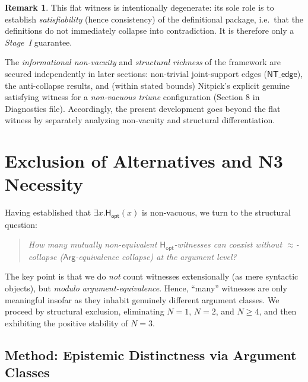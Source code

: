 \documentclass[a4paper, 11pt]{article}
\theoremstyle{plain}
\theoremstyle{definition}
\newtheorem{remark}{Remark}[section]
\newcommand{\Arg}{\mathsf{Arg}}           %
\newcommand{\Hopt}{\mathsf{H_{opt}}}       %
\begin{document}
\begin{remark}
This flat witness is intentionally degenerate: its sole role is to establish \emph{satisfiability} (hence consistency) of the definitional package, i.e.\ that the definitions do not immediately collapse into contradiction.
It is therefore only a \emph{Stage~I} guarantee.

The \emph{informational non-vacuity} and \emph{structural richness} of the framework are secured independently in later sections: non-trivial joint-support edges ($\mathsf{NT\_edge}$), the anti-collapse results, and (within stated bounds) Nitpick's explicit genuine satisfying witness for a \emph{non-vacuous triune} configuration (Section 8 in Diagnostics file).
Accordingly, the present development goes beyond the flat witness by separately analyzing non-vacuity and structural differentiation.
\end{remark}

\newpage


\section{Exclusion of Alternatives and N3 Necessity}
\label{sec:exclusion}

Having established that $\exists x.\Hopt(x)$ is non-vacuous, we turn to the structural question:

\begin{quote}
\emph{How many mutually non-equivalent $\Hopt$-witnesses can coexist without $\approx$-collapse ($\Arg$-equivalence collapse) at the argument level?}
\end{quote}

The key point is that we do \emph{not} count witnesses extensionally (as mere syntactic objects), but \emph{modulo argument-equivalence}.
Hence, ``many'' witnesses are only meaningful insofar as they inhabit genuinely different argument classes.
We proceed by structural exclusion, eliminating $N=1$, $N=2$, and $N\ge 4$, and then exhibiting the positive stability of $N=3$.

\subsection{Method: Epistemic Distinctness via Argument Classes}
\end{document}

